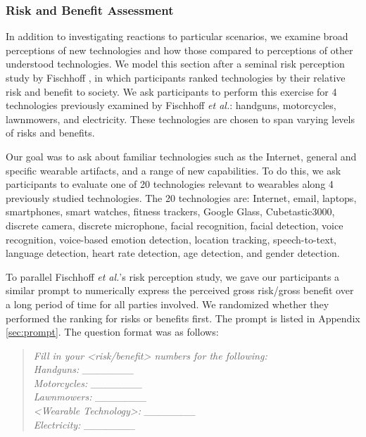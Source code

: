 \subsubsection{Risk and Benefit Assessment}
In addition to investigating reactions to particular scenarios, we examine broad perceptions of new technologies and how those compared to perceptions of other understood technologies. We model this section after a seminal risk perception study by Fischhoff \etal\cite{Fischhoff}, in which participants ranked technologies by their relative risk and benefit to society. We ask participants to perform this exercise for 4 technologies previously examined by Fischhoff {\it et al.}: handguns, motorcycles, lawnmowers, and electricity.  These technologies are chosen to span varying levels of risks and benefits.

Our goal was to ask about familiar technologies such as the Internet, general and specific wearable artifacts, and a range of new capabilities. To do this, we ask participants to evaluate one of 20 technologies relevant to wearables along 4 previously studied technologies. The 20 technologies are: Internet, email, laptops, smartphones, smart watches, fitness trackers, Google Glass, Cubetastic3000, discrete camera, discrete microphone, facial recognition, facial detection, voice recognition, voice-based emotion detection, location tracking, speech-to-text, language detection, heart rate detection, age detection, and gender detection.

To parallel Fischhoff {\it et al.}'s risk perception study, we gave our participants a similar prompt to numerically express the perceived gross risk/gross benefit over a long period of time for all parties involved. We randomized whether they performed the ranking for risks or benefits first. The prompt is listed in Appendix \ref{sec:prompt}. The question format was as follows:

\begin{quotation}
{\it \noindent Fill in your <risk/benefit> numbers for the following:\\

\noindent Handguns: \_\_\_\_\_\_\_ \\
Motorcycles: \_\_\_\_\_\_\_\\
Lawnmowers: \_\_\_\_\_\_\_\\
<Wearable Technology>: \_\_\_\_\_\_\_\\
Electricity: \_\_\_\_\_\_\_\\ }
\end{quotation} 

